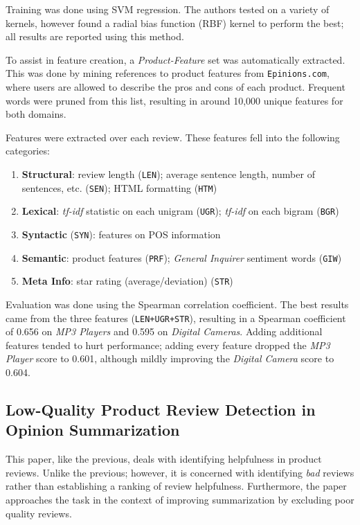 \documentclass[12pt,letterpaper]{article}
\begin{document}
Training was done using SVM regression.
The authors tested on a variety of kernels, however found a radial bias function (RBF)
	kernel to perform the best; all results are reported using this method.

To assist in feature creation, a {\em Product-Feature} set was automatically extracted.
This was done by mining references to product features from {\tt Epinions.com},
	where users are allowed to describe the pros and cons of each product.
Frequent words were pruned from this list, resulting in around 10,000 unique features
	for both domains.

Features were extracted over each review.
These features fell into the following categories:
\begin{enumerate}
	\item {\bf Structural}: review length ({\tt LEN}); average sentence length, 
		number of sentences, etc. ({\tt SEN}); 
		HTML formatting ({\tt HTM})
	\item {\bf Lexical}: {\it tf-idf} statistic on each unigram ({\tt UGR});
		{\it tf-idf} on each bigram ({\tt BGR})
	\item {\bf Syntactic} ({\tt SYN}): features on POS information
	\item {\bf Semantic}: product features ({\tt PRF}); 
		{\it General Inquirer} sentiment words ({\tt GIW}) 
	\item {\bf Meta Info}: star rating (average/deviation) ({\tt STR})
\end{enumerate}

Evaluation was done using the Spearman correlation coefficient.
The best results came from the three features ({\tt LEN+UGR+STR}),
	resulting in a Spearman coefficient of 0.656 on {\em MP3 Players}
	and 0.595 on {\em Digital Cameras}.
Adding additional features tended to hurt performance; adding every feature
	dropped the {\em MP3 Player} score to 0.601,
	although mildly improving the {\em Digital Camera} score to 0.604.

\subsection{Low-Quality Product Review Detection in Opinion Summarization \cite{2007liu-helpfulness}}

This paper, like the previous, deals with identifying helpfulness in product reviews. 
Unlike the previous; however, it is concerned with identifying {\em bad} reviews rather
	than establishing a ranking of review helpfulness.
Furthermore, the paper approaches the task in the context of improving summarization by excluding
	poor quality reviews.
\end{document}
